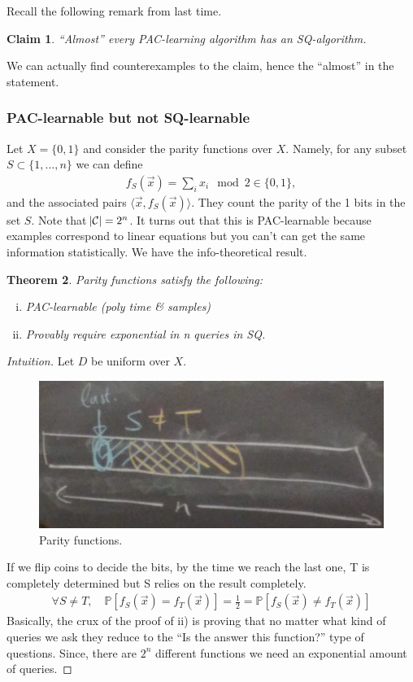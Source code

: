 \documentclass[12pt, letterpaper]{article}
\numberwithin{equation}{section} %
\newcommand{\mb}{\mathbb}
\newcommand{\mc}{\mathcal}
\newtheorem{theorem}{Theorem}[section]
\newtheorem{claim}[theorem]{Claim}
\theoremstyle{definition}
\theoremstyle{remark}
\begin{document}
Recall the following remark from last time.
\begin{claim}
``Almost'' every PAC-learning algorithm has an SQ-algorithm.
\end{claim}

We can actually find counterexamples to the claim, hence the ``almost'' in the statement.
\subsubsection{PAC-learnable but not SQ-learnable}
Let $X=\lbrace 0,1 \rbrace$ and consider the parity functions over $X$. Namely, for any subset $S\subset \lbrace 1,\ldots, n\rbrace$ we can define
\begin{align}
f_S(\vec x) = \sum_ix_i \mod 2 \in \lbrace 0, 1\rbrace,
\end{align}
and the associated pairs $\langle \vec x, f_S(\vec x)\rangle$. They count the parity of the 1 bits in the set $S$. Note that $\abs{\mc C} = 2^n$. It turns out that this is PAC-learnable because examples correspond to linear equations but you can't can get the same information statistically. We have the info-theoretical result.
\begin{theorem}
Parity functions satisfy the following:
\begin{enumerate}[i)]
\item PAC-learnable (poly time \& samples)
\item Provably require exponential in n queries in SQ.
\end{enumerate}
\end{theorem}
\begin{proof}[Intuition]
Let $D$ be uniform over $X$.
\begin{figure}[H]
\centering
\includegraphics[width=0.6\linewidth]{../img/parity.jpg}
\caption{Parity functions.}
\end{figure}
If we flip coins to decide the bits, by the time we reach the last one, T is completely determined but S relies on the result completely.
\begin{align}
\forall S\ne T,\quad\mb P[f_S(\vec x) = f_T(\vec x)] = \frac 12 = \mb P[f_S(\vec x) \ne f_T(\vec x)]
\end{align}
Basically, the crux of the proof of ii) is proving that no matter what kind of queries we ask they reduce to the ``Is the answer this function?'' type of questions. Since, there are $2^n$ different functions we need an exponential amount of queries.
\end{proof}
\end{document}
